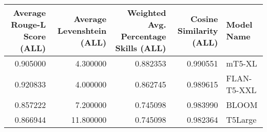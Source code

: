 \begin{tabular}{rrrrl}
\toprule
Average Rouge-L Score (ALL) & Average Levenshtein (ALL) & Weighted Avg. Percentage Skills (ALL) & Cosine Similarity (ALL) & Model Name \\
\midrule
0.905000 & 4.300000 & 0.882353 & 0.990551 & mT5-XL \\
0.920833 & 4.000000 & 0.862745 & 0.989615 & FLAN-T5-XXL \\
0.857222 & 7.200000 & 0.745098 & 0.983990 & BLOOM \\
0.866944 & 11.800000 & 0.745098 & 0.982364 & T5Large \\
\bottomrule
\end{tabular}
